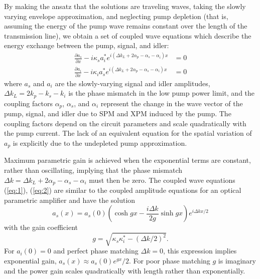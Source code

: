 By making the ansatz that the solutions are traveling waves, taking the slowly varying envelope approximation, and neglecting pump depletion (that is, assuming the energy of the pump wave remains constant over the length of the transmission line), we obtain a set of coupled wave equations which describe the energy exchange between the pump, signal, and idler:
\begin{align}
\frac{{\partial {a_s}}}{{\partial x}} - i{\kappa _s}a_i^*{e^{i(\Delta {k_L} + 2{\alpha _p} - {\alpha _s} - {\alpha _i})x}} &= 0 \label{eq:1} \\
\frac{{\partial {a_i}}}{{\partial x}} - i{\kappa _i}a_s^*{e^{i(\Delta {k_L} + 2{\alpha _p} - {\alpha _s} - {\alpha _i})x}} &= 0 \label{eq:2}
\end{align}
where $a_s$ and $a_i$ are the slowly-varying signal and idler amplitudes, $\Delta {k_L} = 2{k_p} - {k_s} - {k_i}$ is the phase mismatch in the low pump power limit, and the coupling factors $\alpha_p$, $\alpha_s$, and $\alpha_i$ represent the change in the wave vector of the pump, signal, and idler due to SPM and XPM induced by the pump. The coupling factors depend on the circuit parameters and scale quadratically with the pump current. The lack of an equivalent equation for the spatial variation of $a_p$ is explicitly due to the undepleted pump approximation.

Maximum parametric gain is achieved when the exponential terms are constant, rather than oscillating, implying that the phase mismatch $\Delta k = \Delta {k_L} + 2{\alpha _p} - {\alpha _s} - {\alpha _i}$ must then be zero. The coupled wave equations (\ref{eq:1}), (\ref{eq:2}) are similar to the coupled amplitude equations for an optical parametric amplifier \cite{armstrong_interactions_1962} and have the solution
\begin{equation}
{a_s}(x) = {a_s}(0)\left( {\cosh gx - \frac{{i\Delta k}}{{2g}}\sinh gx} \right){e^{i\Delta kx/2}} \label{eq:5}
\end{equation}
with the gain coefficient
\begin{equation}
g=\sqrt{\kappa_s \kappa^*_i -(\Delta k/2)^2}.
\label{eq:g}
\end{equation}
For $a_i(0) = 0$ and perfect phase matching $\Delta k = 0$, this expression implies exponential gain, $a_s(x) \approx a_s(0)e^{gx}/2$. For poor phase matching $g$ is imaginary and the power gain scales quadratically with length rather than exponentially. 

